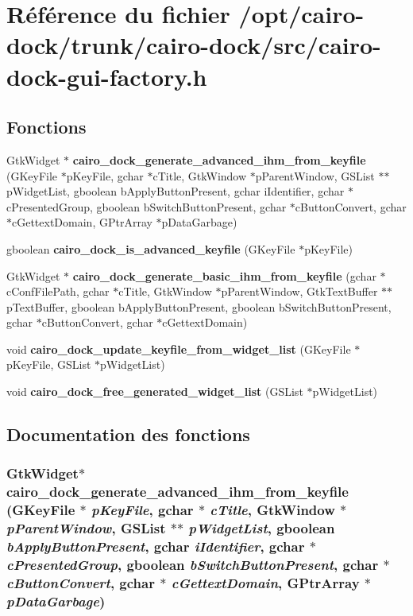 \section{Référence du fichier /opt/cairo-dock/trunk/cairo-dock/src/cairo-dock-gui-factory.h}
\label{cairo-dock-gui-factory_8h}
\subsection*{Fonctions}
\begin{CompactItemize}
\item 
GtkWidget $\ast$ {\bf cairo\_\-dock\_\-generate\_\-advanced\_\-ihm\_\-from\_\-keyfile} (GKeyFile $\ast$pKeyFile, gchar $\ast$cTitle, GtkWindow $\ast$pParentWindow, GSList $\ast$$\ast$pWidgetList, gboolean bApplyButtonPresent, gchar iIdentifier, gchar $\ast$cPresentedGroup, gboolean bSwitchButtonPresent, gchar $\ast$cButtonConvert, gchar $\ast$cGettextDomain, GPtrArray $\ast$pDataGarbage)
\item 
gboolean {\bf cairo\_\-dock\_\-is\_\-advanced\_\-keyfile} (GKeyFile $\ast$pKeyFile)
\item 
GtkWidget $\ast$ {\bf cairo\_\-dock\_\-generate\_\-basic\_\-ihm\_\-from\_\-keyfile} (gchar $\ast$cConfFilePath, gchar $\ast$cTitle, GtkWindow $\ast$pParentWindow, GtkTextBuffer $\ast$$\ast$pTextBuffer, gboolean bApplyButtonPresent, gboolean bSwitchButtonPresent, gchar $\ast$cButtonConvert, gchar $\ast$cGettextDomain)
\item 
void {\bf cairo\_\-dock\_\-update\_\-keyfile\_\-from\_\-widget\_\-list} (GKeyFile $\ast$pKeyFile, GSList $\ast$pWidgetList)
\item 
void {\bf cairo\_\-dock\_\-free\_\-generated\_\-widget\_\-list} (GSList $\ast$pWidgetList)
\end{CompactItemize}


\subsection{Documentation des fonctions}
\subsubsection{\setlength{\rightskip}{0pt plus 5cm}GtkWidget$\ast$ cairo\_\-dock\_\-generate\_\-advanced\_\-ihm\_\-from\_\-keyfile (GKeyFile $\ast$ {\em pKeyFile}, gchar $\ast$ {\em cTitle}, GtkWindow $\ast$ {\em pParentWindow}, GSList $\ast$$\ast$ {\em pWidgetList}, gboolean {\em bApplyButtonPresent}, gchar {\em iIdentifier}, gchar $\ast$ {\em cPresentedGroup}, gboolean {\em bSwitchButtonPresent}, gchar $\ast$ {\em cButtonConvert}, gchar $\ast$ {\em cGettextDomain}, GPtrArray $\ast$ {\em pDataGarbage})}\label{cairo-dock-gui-factory_8h_b31172d7cfb892c840f50f4f3df03d68}


